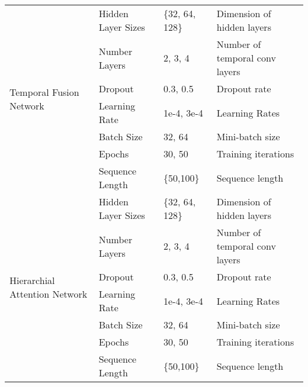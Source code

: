 \documentclass{article}
\begin{document}
\begin{table}[htbp]
\begin{tabular}{llll}
        \midrule
        \multirow{7}{*}{Temporal Fusion Network}       & Hidden Layer Sizes      & \{32, 64, 128\}        & Dimension of hidden layers      \\
                                                       & Number Layers           & {2, 3, 4}              & Number of temporal conv layers  \\
                                                       & Dropout                 & {0.3, 0.5}             & Dropout rate                    \\
                                                       & Learning Rate           & {1e-4, 3e-4}           & Learning Rates                  \\
                                                       & Batch Size              & {32, 64}               & Mini-batch size                 \\
                                                       & Epochs                  & {30, 50}               & Training iterations             \\
                                                       & Sequence Length         & \{50,100\}             & Sequence length                 \\
        \midrule
        \multirow{7}{*}{Hierarchial Attention Network} & Hidden Layer Sizes      & \{32, 64, 128\}        & Dimension of hidden layers      \\
                                                       & Number Layers           & {2, 3, 4}              & Number of temporal conv layers  \\
                                                       & Dropout                 & {0.3, 0.5}             & Dropout rate                    \\
                                                       & Learning Rate           & {1e-4, 3e-4}           & Learning Rates                  \\
                                                       & Batch Size              & {32, 64}               & Mini-batch size                 \\
                                                       & Epochs                  & {30, 50}               & Training iterations             \\
                                                       & Sequence Length         & \{50,100\}             & Sequence length                 \\
        \midrule
    \end{tabular}

    \label{tab:dataset-representation}


\end{table}
\end{document}
